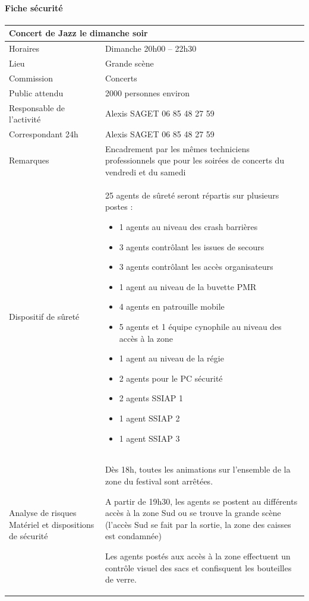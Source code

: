 \documentclass[hidelinks, paper=a4, fontsize=13pt]{report}
\begin{document}
\paragraph{Fiche sécurité}
\begin{center}
\begin{tabular}{ | p{6cm} | p{10cm} | }
\hline
	\multicolumn{2}{|l|}{Concert de Jazz le dimanche soir } \\ \hline
	Horaires & Dimanche  20h00 – 22h30 \\ \hline
	Lieu & Grande scène \\ \hline
	Commission & Concerts \\ \hline
	Public attendu & 2000 personnes environ \\ \hline
	Responsable de l'activité & Alexis SAGET 06 85 48 27 59 \\ \hline
	Correspondant 24h & Alexis SAGET 06 85 48 27 59  \\ \hline
	Remarques & Encadrement par les mêmes techniciens professionnels que pour les soirées de concerts du vendredi et du samedi \\ \hline
	Dispositif de sûreté & 25 agents de sûreté seront répartis sur plusieurs postes :
	\begin{itemize}
	\item 1 agents au niveau des crash barrières
	\item 3 agents contrôlant les issues de secours
	\item 3 agents contrôlant les accès organisateurs
	\item 1 agent au niveau de la buvette PMR
	\item 4 agents en patrouille mobile
	\item 5 agents et 1 équipe cynophile au niveau des accès à la zone
	\item 1 agent au niveau de la régie
	\item 2 agents pour le PC sécurité
	\item 2 agents SSIAP 1
	\item 1 agent SSIAP 2
	\item 1 agent SSIAP 3
	\end{itemize}
 \\ \hline
	Analyse de risques
Matériel et dispositions de sécurité & Dès 18h, toutes les animations sur l’ensemble de la zone du festival sont arrêtées. 

A partir de 19h30, les agents se postent au différents accès à la zone Sud ou se trouve la grande scène (l’accès Sud se fait par la sortie, la zone des caisses est condamnée) 

Les agents postés aux accès à la zone effectuent un contrôle visuel des sacs et confisquent les bouteilles de verre. 

 \\ \hline
\end{tabular}

\end{center}
\end{document}
